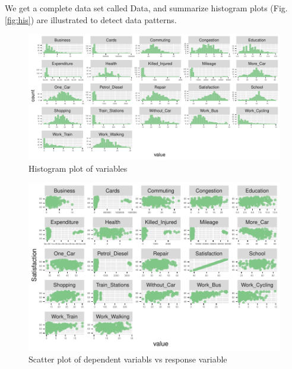 \documentclass[
]{article}
\newenvironment{Shaded}{\begin{snugshade}}{\end{snugshade}}
\newcommand{\CommentTok}[1]{\textcolor[rgb]{0.56,0.35,0.01}{\textit{#1}}}
\newcommand{\FunctionTok}[1]{\textcolor[rgb]{0.00,0.00,0.00}{#1}}
\newcommand{\NormalTok}[1]{#1}
\newcommand{\OtherTok}[1]{\textcolor[rgb]{0.56,0.35,0.01}{#1}}
\newcommand{\SpecialCharTok}[1]{\textcolor[rgb]{0.00,0.00,0.00}{#1}}
\begin{document}
\begin{Shaded}
\end{Shaded}

We get a complete data set called Data, and summarize histogram plots
(Fig. \ref{fig:his}) are illustrated to detect data patterns.

\begin{figure}[H]

{\centering \includegraphics{RMD-Group-28_files/figure-latex/unnamed-chunk-3-1} 

}

\caption{\label{fig:his} Histogram plot of variables}\label{fig:unnamed-chunk-3}
\end{figure}

\begin{figure}[H]

{\centering \includegraphics{RMD-Group-28_files/figure-latex/unnamed-chunk-4-1} 

}

\caption{\label{fig:scatter} Scatter plot of dependent variabls vs response variable}\label{fig:unnamed-chunk-4}
\end{figure}
\end{document}
